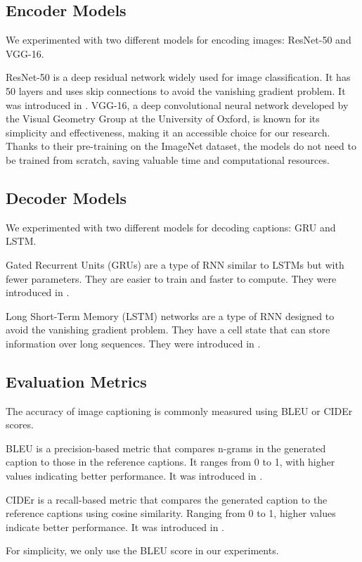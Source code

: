 \documentclass[12pt]{article}
\theoremstyle{plain}
\theoremstyle{definition}
\theoremstyle{remark}
\begin{document}
\subsection{Encoder Models}
We experimented with two different models for encoding images: ResNet-50 and VGG-16.
\par ResNet-50 is a deep residual network widely used for image classification. It has 50 layers and uses skip connections to avoid the vanishing gradient problem. It was introduced in \cite{he}.
VGG-16, a deep convolutional neural network developed by the Visual Geometry Group at the University of Oxford, is known for its simplicity and effectiveness, making it an accessible choice for our research.
Thanks to their pre-training on the ImageNet dataset, the models do not need to be trained from scratch, saving valuable time and computational resources.

\subsection{Decoder Models}
We experimented with two different models for decoding captions: GRU and LSTM.
\par Gated Recurrent Units (GRUs) are a type of RNN similar to LSTMs but with fewer parameters. They are easier to train and faster to compute. They were introduced in \cite{cho}.
\par Long Short-Term Memory (LSTM) networks are a type of RNN designed to avoid the vanishing gradient problem. They have a cell state that can store information over long sequences. They were introduced in \cite{hochreiter}.

\subsection{Evaluation Metrics}
The accuracy of image captioning is commonly measured using BLEU or CIDEr scores.
\par BLEU is a precision-based metric that compares n-grams in the generated caption to those in the reference captions. It ranges from 0 to 1, with higher values indicating better performance. It was introduced in \cite{papineni}.
\par CIDEr is a recall-based metric that compares the generated caption to the reference captions using cosine similarity. Ranging from 0 to 1, higher values indicate better performance. It was introduced in \cite{vedantam}.
\par For simplicity, we only use the BLEU score in our experiments.
\end{document}
